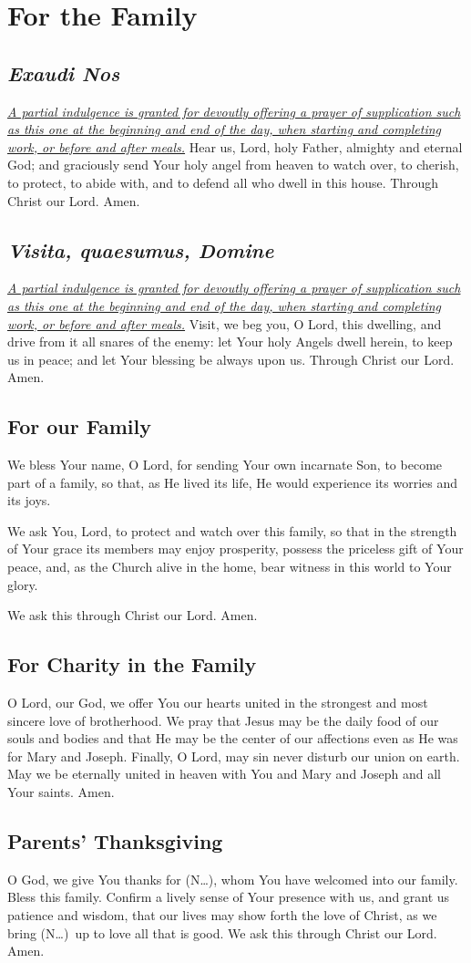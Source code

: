 \documentclass[12pt]{article}
\newcommand{\prayersection}[1]{\section{#1}}
\newcommand{\prayertitle}[1]{\subsection{#1}}
\newcommand{\indulgencedprayertitle}[1]{\prayertitle{#1 \protect\kreuz}}
\newcommand{\insertname}{(N\dots)}
\newcommand{\foreign}[1]{\textsl{#1}}
\newcommand{\note}[1]{{\small{\textsl{#1}}}\newline}
\newcommand{\linkednote}[2]{\hyperlink{#1}{\note{#2}}}
\begin{document}
\newpage

\prayersection{For the Family}
\indulgencedprayertitle{\foreign{Exaudi Nos}}
\linkednote{grant26}{A partial indulgence is granted for devoutly offering a prayer of supplication such as this one at the beginning and end of the day, when starting and completing work, or before and after meals.}
Hear us, Lord, holy Father, almighty and eternal God;
and graciously send Your holy angel from heaven to watch over, to cherish, to protect, to abide with, and to defend all who dwell in this house.
Through Christ our Lord. Amen.

\indulgencedprayertitle{\foreign{Visita, quaesumus, Domine}}
\linkednote{grant26}{A partial indulgence is granted for devoutly offering a prayer of supplication such as this one at the beginning and end of the day, when starting and completing work, or before and after meals.}
Visit, we beg you, O Lord, this dwelling, and drive from it all snares of the enemy:
let Your holy Angels dwell herein, to keep us in peace;
and let Your blessing be always upon us.
Through Christ our Lord.
Amen.

\prayertitle{For our Family}
We bless Your name, O Lord, for sending Your own incarnate Son, to become part of a family, so that, as He lived its life, He would experience its worries and its joys.

We ask You, Lord, to protect and watch over this family, so that in the strength of Your grace its members may enjoy prosperity, possess the priceless gift of Your peace, and, as the Church alive in the home, bear witness in this world to Your glory.

We ask this through Christ our Lord.
Amen.
\newpage
\prayertitle{For Charity in the Family}
O Lord, our God, we offer You our hearts united in the strongest and most sincere love of brotherhood.
We pray that Jesus may be the daily food of our souls and bodies and that He may be the center of our affections even as He was for Mary and Joseph.
Finally, O Lord, may sin never disturb our union on earth.
May we be eternally united in heaven with You and Mary and Joseph and all Your saints.
Amen.

\prayertitle{Parents' Thanksgiving}
O God, we give You thanks for \insertname, whom You have welcomed into our family.
Bless this family.
Confirm a lively sense of Your presence with us, and grant us patience and wisdom, that our lives may show forth the love of Christ, as we bring \insertname\ up to love all that is good.
We ask this through Christ our Lord.
Amen.
\end{document}
